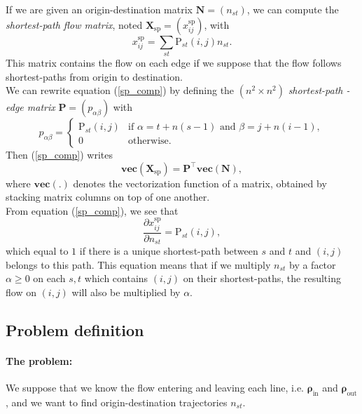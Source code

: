 \documentclass[11p]{article}
\begin{document}
If we are given an origin-destination matrix $\mathbf{N} = (n_{st})$, we can compute the \emph{shortest-path flow matrix}, noted $\mathbf{X}_\text{sp} = (x^\text{sp}_{ij})$, with
\begin{equation}
x^\text{sp}_{ij} = \sum_{st} \text{P}_{st}(i, j) n_{st} \label{sp_comp}.
\end{equation}
This matrix contains the flow on each edge if we suppose that the flow follows shortest-paths from origin to destination. \\

We can rewrite equation (\ref{sp_comp}) by defining the $(n^2 \times n^2)$ \emph{shortest-path - edge matrix} $\mathbf{P} = (p_{\alpha \beta})$ with
\begin{equation}
p_{\alpha \beta} = \begin{cases}
\text{P}_{st}(i, j) & \text{if } \alpha = t + n(s - 1) \text{ and }  \beta = j + n(i - 1), \\
0 & \text{otherwise}.
\end{cases}
\end{equation}
Then (\ref{sp_comp}) writes
\begin{equation}
\textbf{vec}(\mathbf{X}_\text{sp}) = \mathbf{P}^\top \textbf{vec}(\mathbf{N}),
\end{equation}
where $\textbf{vec}(.)$ denotes the vectorization function of a matrix, obtained by stacking matrix columns on top of one another. \\

From equation (\ref{sp_comp}), we see that 
\begin{equation}
\frac{\partial x^\text{sp}_{ij}}{\partial n_{st}} = \text{P}_{st}(i, j),
\end{equation}
which equal to $1$ if there is a unique shortest-path between $s$ and $t$ and $(i,j)$ belongs to this path. This equation means that if we multiply $n_{st}$ by a factor $\alpha \geq 0$ on each $s, t$ which contains $(i, j)$ on their shortest-paths, the resulting flow on $(i, j)$ will also be multiplied by $\alpha$.

\subsection{Problem definition}

\paragraph{The problem:} We suppose that we know the flow entering and leaving each line, i.e. $\bm{\rho}_\text{in}$ and $\bm{\rho}_\text{out}$, and we want to find origin-destination trajectories $n_{st}$. \\
\end{document}
